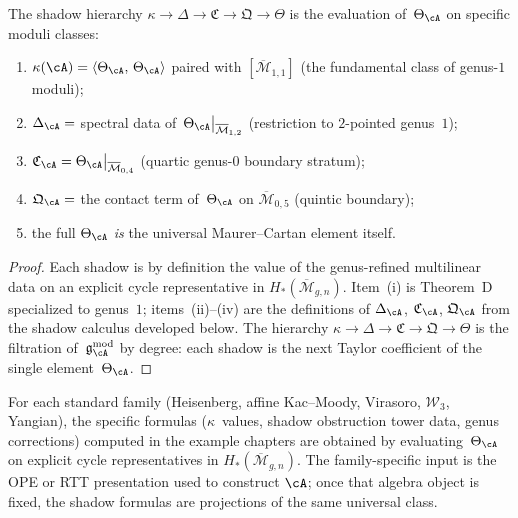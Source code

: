\begin{theorem}
\label{thm:nms-shadow-tower-mc}%
%
The shadow hierarchy
$\kappa \to \Delta \to \mathfrak{C} \to \mathfrak{Q} \to \Theta$
is the evaluation of~$\Theta_{\cA}$ on specific moduli classes:
\begin{enumerate}[label=\textup{(\roman*)}]
\item $\kappa(\cA) =
 \langle \Theta_{\cA},\, \Theta_{\cA} \rangle$
 paired with
 $[\overline{\mathcal{M}}_{1,1}]$
 (the fundamental class of genus-$1$ moduli);
\item $\Delta_{\cA} =$
 spectral data of~$\Theta_{\cA}\big|_{\overline{\mathcal{M}}_{1,2}}$
 (restriction to $2$-pointed genus~$1$);
\item $\mathfrak{C}_{\cA} =
 \Theta_{\cA}\big|_{\overline{\mathcal{M}}_{0,4}}$
 (quartic genus-$0$ boundary stratum);
\item $\mathfrak{Q}_{\cA} =$
 the contact term of~$\Theta_{\cA}$ on
 $\overline{\mathcal{M}}_{0,5}$
 (quintic boundary);
\item the full $\Theta_{\cA}$ \emph{is} the universal
 Maurer--Cartan element itself.
\end{enumerate}
\end{theorem}

\begin{proof}
Each shadow is by definition the value of the genus-refined
multilinear data on an explicit cycle representative in
$H_*(\overline{\mathcal{M}}_{g,n})$.
Item~(i) is Theorem~D specialized to genus~$1$; items~(ii)--(iv)
are the definitions of
$\Delta_{\cA}$, $\mathfrak{C}_{\cA}$, $\mathfrak{Q}_{\cA}$
from the shadow calculus developed below. The hierarchy
$\kappa \to \Delta \to \mathfrak{C} \to \mathfrak{Q} \to \Theta$
is the filtration of~$\gAmod$ by degree: each shadow is the
next Taylor coefficient of the single element~$\Theta_{\cA}$.
\end{proof}

\begin{corollary}
\label{cor:nms-all-families-universal}%
%
For each standard family (Heisenberg, affine Kac--Moody,
Virasoro, $\mathcal{W}_3$, Yangian), the specific formulas
($\kappa$~values, shadow obstruction tower data, genus corrections) computed
in the example chapters are obtained by evaluating~$\Theta_{\cA}$ on
explicit cycle representatives in
$H_*(\overline{\mathcal{M}}_{g,n})$.
The family-specific input is the OPE or RTT presentation used to
construct $\cA$; once that algebra object is fixed, the shadow
formulas are projections of the same universal class.
\end{corollary}


